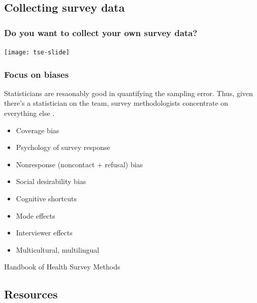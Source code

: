 \documentclass{beamer}
\begin{document}
\subsection{Collecting survey data}

\begin{frame}\frametitle{Do you want to collect your own survey data?}

\centering

\texttt{[image: tse-slide]}

\end{frame}

\begin{frame}\frametitle{Focus on biases}

Statisticians are resaonably good in quantifying the sampling error. Thus,
given there's a statistician on the team,
survey methodologists concentrate on everything else
\citep{grov:fowl:coup:lepk:sing:tour:2009,groves:lyberg:2010}.

\begin{itemize}
    \item Coverage bias
    \item Psychology of survey response
    \item Nonresponse (noncontact + refusal) bias
    \item Social desirability bias
    \item Cognitive shortcuts
    \item Mode effects
    \item Interviewer effects
    \item Multicultural, multilingual
\end{itemize}

Handbook of Health Survey Methods \citep{johnson:2015:handbook}

\end{frame}

\subsection{Resources}
\end{document}
